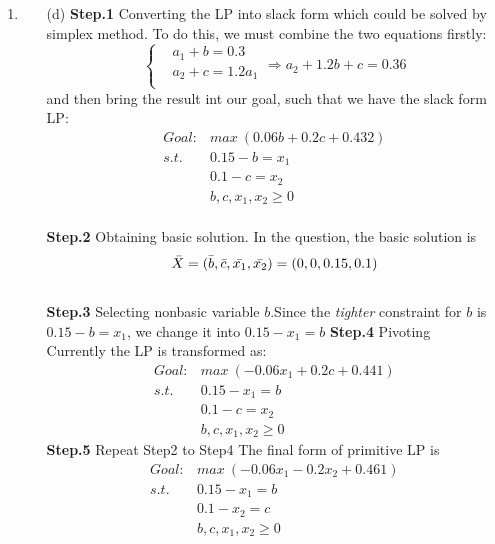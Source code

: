 \documentclass[12pt,a4paper]{article}
\makeatletter
\newtheorem*{solution}{Solution}
\theoremstyle{definition}
\renewenvironment{solution}[1][Solution] {\par\pushQED{\qed}\normalfont\topsep6\p@\@plus6\p@\relax\trivlist\item[\hskip\labelsep\bfseries#1\@addpunct{.}]\ignorespaces}{\popQED\endtrivlist\@endpefalse} \makeatother
\makeatother
\begin{document}
\begin{enumerate}
\begin{solution}
\begin{enumerate}
        \item [(d)]
        \textbf{Step.1} Converting the LP into slack form which could be solved by simplex method. To do this, we must combine the two equations firstly:
        \begin{equation}
            \begin{cases}
            & a_1+b=0.3 \\
            & a_2+c=1.2 a_1\\ 
            \end{cases}
            \Rightarrow
            a_2+1.2b+c=0.36       
        \end{equation}
        and then bring the result int our goal, such that we have the slack form LP:
        \begin{equation}
            \begin{split}
                Goal: & max\ (0.06b+0.2c+0.432) \\ 
             s.t.\  & 0.15-b=x_1\\
                    & 0.1-c=x_2\\
                    & b,c,x_1,x_2\geq 0
            \end{split}
        \end{equation}
        \\
        \textbf{Step.2} Obtaining basic solution. In the question, the basic solution is 
        $$\Bar{X}=(\Bar{b},\Bar{c},\Bar{x_1},\Bar{x_2})=(0,0,0.15,0.1)$$
        \\
        \textbf{Step.3} Selecting nonbasic variable $b$.Since the \emph{tighter} constraint for $b$ is $0.15-b=x_1$, we change it into $0.15-x_1=b$
        \textbf{Step.4} Pivoting
        \\
        Currently the LP is transformed as:
        \begin{equation}\nonumber
            \begin{split}
             Goal: & max\ (-0.06x_1+0.2c+0.441) \\ 
             s.t.\  & 0.15-x_1=b\\
                    & 0.1-c=x_2\\
                    & b,c,x_1,x_2\geq 0
            \end{split}
        \end{equation}
        \textbf{Step.5} Repeat Step2 to Step4
        The final form of primitive LP is 
        \begin{equation}\nonumber
            \begin{split}
             Goal: & max\ (-0.06x_1-0.2x_2+0.461) \\ 
             s.t.\  & 0.15-x_1=b\\
                    & 0.1-x_2=c\\
                    & b,c,x_1,x_2\geq 0
            \end{split}
        \end{equation}
        

\end{enumerate}
\end{solution}
\end{enumerate}
\end{document}
